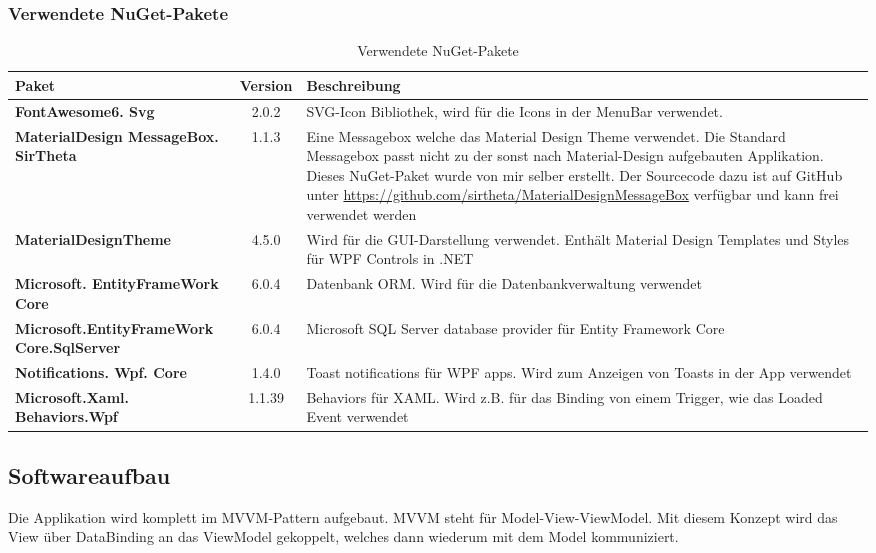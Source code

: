 \subsubsection{Verwendete NuGet-Pakete}
\begin{table}[H]
  \centering
  \settowidth{}
  \setlength\extrarowheight{2pt}
    \begin{tabulary}{1.0\textwidth}{|L|C|L|}
      \hline
      \textbf{Paket} & \textbf{Version} & \textbf{Beschreibung}\\
    \hline
    \textbf{FontAwesome6. Svg} & 2.0.2 & SVG-Icon Bibliothek, wird für die Icons in der MenuBar verwendet.\\
    \hline
    \textbf{MaterialDesign MessageBox. SirTheta} & 1.1.3 & Eine Messagebox welche das Material Design Theme verwendet. Die Standard Messagebox passt nicht zu der sonst nach Material-Design aufgebauten Applikation. Dieses NuGet-Paket wurde von mir selber erstellt. Der Sourcecode dazu ist auf GitHub unter \href{https://github.com/sirtheta/MaterialDesignMessageBox}{https://github.com/sirtheta/MaterialDesignMessageBox} verfügbar und kann frei verwendet werden\\
    \hline
    \textbf{MaterialDesignTheme} & 4.5.0 & Wird für die GUI-Darstellung verwendet. Enthält Material Design Templates und Styles für WPF Controls in .NET\\
    \hline
    \textbf{Microsoft. EntityFrameWork Core} & 6.0.4 & Datenbank ORM. Wird für die Datenbankverwaltung verwendet\\
    \hline
    \textbf{Microsoft.EntityFrameWork Core.SqlServer} & 6.0.4 & Microsoft SQL Server database provider für Entity Framework Core\\
    \hline
    \textbf{Notifications. Wpf. Core} & 1.4.0 & Toast notifications für WPF apps. Wird zum Anzeigen von Toasts in der App verwendet \\
    \hline
    \textbf{Microsoft.Xaml. Behaviors.Wpf} & 1.1.39 & Behaviors für XAML. Wird z.B. für das Binding von einem Trigger, wie das Loaded Event verwendet\\
    \hline
\end{tabulary}
\caption{Verwendete NuGet-Pakete}
\end{table}

\newpage
\subsection{Softwareaufbau}
Die Applikation wird komplett im MVVM-Pattern aufgebaut. MVVM steht für Model-View-ViewModel. Mit diesem Konzept wird das View über DataBinding an das ViewModel gekoppelt, welches dann wiederum mit dem Model kommuniziert. 

